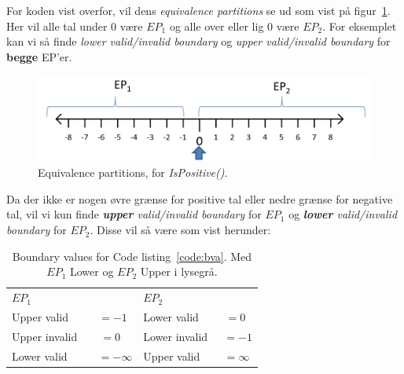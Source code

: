 For koden vist overfor, vil dens \textit{equivalence partitions} se ud som vist på figur~\ref{fig:ep}. Her vil alle tal under 0 være $EP_1$ og alle over eller lig 0 være $EP_2$. For eksemplet kan vi så finde \textit{lower valid/invalid boundary} og \textit{upper valid/invalid boundary} for \textbf{begge} EP'er.

\begin{figure}[h]
\centering
\includegraphics[width=\linewidth]{figs/ep}
\caption{Equivalence partitions, for \textit{IsPositive()}.}
\label{fig:ep}
\end{figure}

Da der ikke er nogen øvre grænse for positive tal eller nedre grænse for negative tal, vil vi kun finde \textit{\textbf{upper} valid/invalid boundary} for $EP_1$ og \textit{\textbf{lower} valid/invalid boundary} for $EP_2$. Disse vil så være som vist herunder:

\begin{table}[H]
	\centering
	\begin{tabular}{lclc}
		\rowcolor{Black!25} $EP_1$ 		&				& $EP_2$ 		&			\\ %
		Upper valid						&$~~=-1$			& Lower valid	& $=0$		\\
		Upper invalid 					&$=0$			& Lower invalid	& $~~=-1$		\\ %
		\rowcolor{Black!5} Lower valid	&$~~~~= -\infty$	& Upper valid 	&$~= \infty$ \\ %
	\end{tabular}
	\caption{Boundary values for Code listing~\ref{code:bva}. Med $EP_1$ Lower og $EP_2$ Upper i lysegrå.}
\end{table}

















